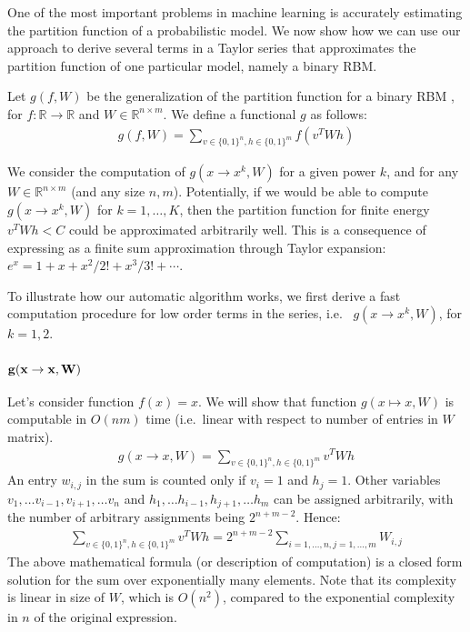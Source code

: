 One of the most important problems in machine learning is accurately
estimating the partition function of a probabilistic model. We now
show how we can use our approach to derive several terms in a Taylor
series that approximates the partition function of one particular
model, namely a binary RBM. 

Let $g(f, W)$ be the generalization of the partition function for a binary
RBM \cite{hinton2002training}, for $f: \mathbb{R} \rightarrow \mathbb{R}$ and $W \in \mathbb{R}^{n \times m}$.
We define a functional $g$ as follows: \\
\vspace{-0.3cm}
\begin{align*}
g(f, W) = \sum_{v \in \{0, 1\}^n, h \in \{0, 1\}^m} f(v^TWh)
\end{align*}
\vspace{-0.1cm}

We consider the computation of $g(x \rightarrow x^k, W)$ for a given power
$k$, and for any $W \in \mathbb{R}^{n \times m}$ (and any size $n, m$). Potentially, if we would be able
to compute $g(x \rightarrow x^k, W)$ for $k = 1, \dots, K$, then the partition
function for finite energy $v^TWh < C$ could be approximated arbitrarily well.
This is a consequence of expressing as a finite sum approximation through
Taylor expansion: $e^{x}=1+x+x^2/2!+x^3/3!+\cdots$.

To illustrate how our automatic algorithm works, we first derive a
fast computation procedure for low order terms in the series, i.e.~ $g(x
\rightarrow x^k, W)$, for $k = 1, 2$. 


\subsubsection{{$\bf g(x \rightarrow x, W)$}} \label{subsubsec:gx} Let's consider function $f(x) = x$. We
will show that function $g(x \mapsto x, W)$ is computable in $O(nm)$ time
(i.e.~linear with respect to number of entries in $W$ matrix).
\begin{gather*}
	g(x \rightarrow x, W) = \sum_{v \in \{0, 1\}^n, h \in \{0, 1\}^m} v^TWh
\end{gather*}
An entry $w_{i,j}$ in the sum is counted only if $v_i = 1$ and $h_j = 1$. Other variables
$v_1, \dots v_{i-1}, v_{i+1}, \dots v_n$ and $h_1, \dots h_{i-1}, h_{j+1}, \dots h_m$ can be 
assigned arbitrarily, with the number of arbitrary assignments being
$2^{n + m - 2}$. Hence:
\begin{gather*}
	\sum_{v \in \{0, 1\}^n, h \in \{0, 1\}^m} v^TWh = 2^{n + m - 2}\sum_{i = 1, \dots, n, j = 1, \dots, m} W_{i, j}
\end{gather*}
The above mathematical formula (or description of computation) is a
closed form solution for the sum over exponentially many
elements. Note that its complexity is linear in size of $W$, which is
$O(n^2)$, compared to the exponential complexity in $n$ of the
original expression.


